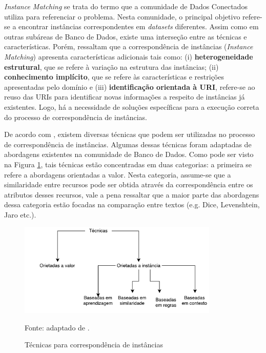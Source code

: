 \textit{Instance Matching} se trata do termo que a  comunidade de Dados Conectados utiliza para referenciar o problema. Nesta comunidade, o principal objetivo refere-se a encontrar instâncias correspondentes em \textit{datasets} diferentes. Assim como em outras subáreas de Banco de Dados, existe uma interseção entre as técnicas e características. Porém,  ressaltam que a correspondência de instâncias (\textit{Instance Matching}) apresenta características adicionais tais como: (i) \textbf{heterogeneidade estrutural}, que se refere à variação na estrutura das instâncias; (ii)\textbf{ conhecimento implícito}, que se refere às características e restrições  apresentadas pelo domínio e (iii) \textbf{identificação orientada à URI}, refere-se ao reuso das URIs para identificar novas informações a respeito de instâncias já existentes. Logo, há a necessidade de soluções específicas para a execução correta do processo de correspondência de instâncias. 

De acordo com \cite{castano2011ontology}, existem diversas técnicas que podem ser utilizadas no processo de correspondência de instâncias. Algumas dessas técnicas foram adaptadas de abordagens existentes na comunidade de Banco de Dados. Como pode ser visto na Figura \ref{fig:im_techniques}, tais técnicas estão concentradas em duas categorias: a primeira se refere a abordagens orientadas a valor. Nesta categoria, assume-se que a similaridade entre recursos pode ser obtida através da correspondência entre os atributos desses recursos, vale a pena ressaltar que a maior parte das abordagens dessa categoria estão focadas na comparação entre textos (e.g. Dice, Levenshtein, Jaro etc.).

\begin{figure}[!h]
	\centering
	\includegraphics[width=0.85\textwidth]{./imagens/im_techniques.pdf}
	\caption{Técnicas para correspondência de instâncias}
	\footnotesize{Fonte: adaptado de \cite{castano2011ontology}.}
	\label{fig:im_techniques}
\end{figure}

